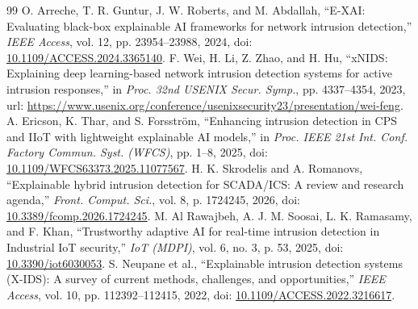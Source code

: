 \documentclass[10pt,a4paper]{article}
\begin{document}
\begin{thebibliography}{99}
 O. Arreche, T. R. Guntur, J. W. Roberts, and M. Abdallah, ``E-XAI: Evaluating black-box explainable AI frameworks for network intrusion detection,'' \emph{IEEE Access}, vol. 12, pp. 23954--23988, 2024, doi: \href{https://doi.org/10.1109/ACCESS.2024.3365140}{10.1109/ACCESS.2024.3365140}.
 F. Wei, H. Li, Z. Zhao, and H. Hu, ``xNIDS: Explaining deep learning-based network intrusion detection systems for active intrusion responses,'' in \emph{Proc. 32nd USENIX Secur. Symp.}, pp. 4337--4354, 2023, url: \url{https://www.usenix.org/conference/usenixsecurity23/presentation/wei-feng}.
 A. Ericson, K. Thar, and S. Forsstr\"om, ``Enhancing intrusion detection in CPS and IIoT with lightweight explainable AI models,'' in \emph{Proc. IEEE 21st Int. Conf. Factory Commun. Syst. (WFCS)}, pp. 1--8, 2025, doi: \href{https://doi.org/10.1109/WFCS63373.2025.11077567}{10.1109/WFCS63373.2025.11077567}.
 H. K. Skrodelis and A. Romanovs, ``Explainable hybrid intrusion detection for SCADA/ICS: A review and research agenda,'' \emph{Front. Comput. Sci.}, vol. 8, p. 1724245, 2026, doi: \href{https://doi.org/10.3389/fcomp.2026.1724245}{10.3389/fcomp.2026.1724245}.
 M. Al Rawajbeh, A. J. M. Soosai, L. K. Ramasamy, and F. Khan, ``Trustworthy adaptive AI for real-time intrusion detection in Industrial IoT security,'' \emph{IoT (MDPI)}, vol. 6, no. 3, p. 53, 2025, doi: \href{https://doi.org/10.3390/iot6030053}{10.3390/iot6030053}.
 S. Neupane et al., ``Explainable intrusion detection systems (X-IDS): A survey of current methods, challenges, and opportunities,'' \emph{IEEE Access}, vol. 10, pp. 112392--112415, 2022, doi: \href{https://doi.org/10.1109/ACCESS.2022.3216617}{10.1109/ACCESS.2022.3216617}.
\end{thebibliography}
\end{document}

